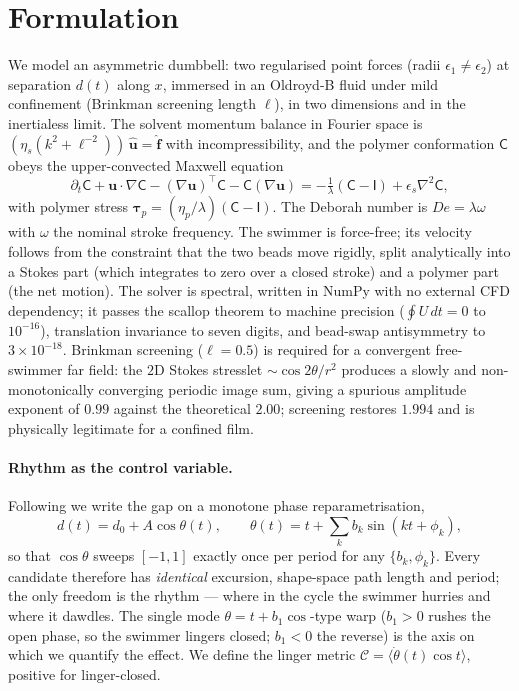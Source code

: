 \documentclass[11pt]{article}
\newcommand{\De}{\mathit{De}}
\newcommand{\Cten}{\mathsf{C}}
\begin{document}
\section{Formulation}
We model an asymmetric dumbbell: two regularised point forces (radii $\epsilon_1\neq\epsilon_2$)
at separation $d(t)$ along $x$, immersed in an Oldroyd-B fluid under mild confinement (Brinkman
screening length $\ell$), in two dimensions and in the inertialess limit. The solvent momentum
balance in Fourier space is $(\eta_s(k^2+\ell^{-2}))\,\hat{\mathbf u} = \hat{\mathbf f}$ with
incompressibility, and the polymer conformation $\Cten$ obeys the upper-convected Maxwell
equation
\begin{equation}
\partial_t\Cten + \mathbf u\!\cdot\!\nabla\Cten
 - (\nabla\mathbf u)^{\!\top}\Cten - \Cten(\nabla\mathbf u)
 = -\tfrac{1}{\lambda}(\Cten-\mathsf{I}) + \epsilon_s\nabla^2\Cten,
\label{eq:ucm}
\end{equation}
with polymer stress $\boldsymbol\tau_p=(\eta_p/\lambda)(\Cten-\mathsf{I})$. The Deborah number is
$\De=\lambda\omega$ with $\omega$ the nominal stroke frequency. The swimmer is force-free; its
velocity follows from the constraint that the two beads move rigidly, split analytically into a
Stokes part (which integrates to zero over a closed stroke) and a polymer part (the net motion).
The solver is spectral, written in NumPy with no external CFD dependency; it passes the scallop
theorem to machine precision ($\oint U\,dt = 0$ to $10^{-16}$), translation invariance to seven
digits, and bead-swap antisymmetry to $3\times10^{-18}$. Brinkman screening ($\ell=0.5$) is
required for a convergent free-swimmer far field: the $2$D Stokes stresslet
$\sim\!\cos2\theta/r^2$ produces a slowly and non-monotonically converging periodic image sum,
giving a spurious amplitude exponent of $0.99$ against the theoretical $2.00$; screening restores
$1.994$ and is physically legitimate for a confined film.

\paragraph{Rhythm as the control variable.} Following \citet{fu2009} we write the gap on a
monotone phase reparametrisation,
\begin{equation}
d(t) = d_0 + A\cos\theta(t), \qquad \theta(t) = t + \textstyle\sum_k b_k\sin(kt+\phi_k),
\label{eq:reparam}
\end{equation}
so that $\cos\theta$ sweeps $[-1,1]$ exactly once per period for any $\{b_k,\phi_k\}$. Every
candidate therefore has \emph{identical} excursion, shape-space path length and period; the only
freedom is the rhythm --- where in the cycle the swimmer hurries and where it dawdles. The single
mode $\theta = t + b_1\cos$-type warp ($b_1>0$ rushes the open phase, so the swimmer lingers
closed; $b_1<0$ the reverse) is the axis on which we quantify the effect. We define the linger
metric $\mathcal{C}=\langle\dot\theta(t)\cos t\rangle$, positive for linger-closed.
\end{document}
